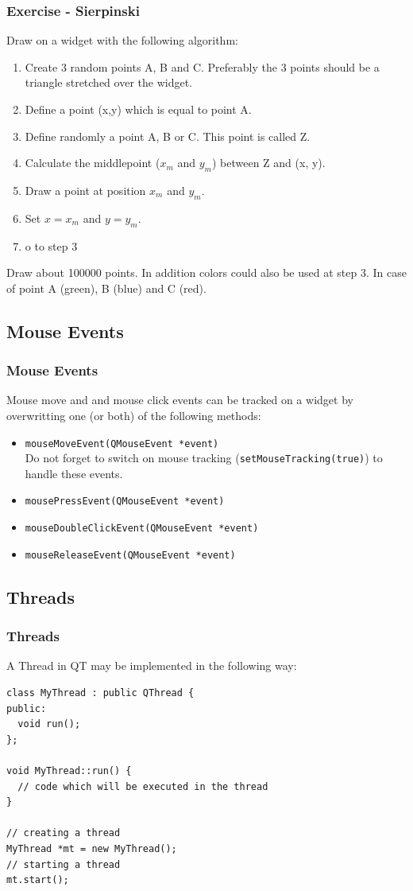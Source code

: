 \begin{frame}[fragile]
\frametitle{Exercise - Sierpinski}
Draw on a widget with the following algorithm:
{\small
\begin{enumerate}
\item Create 3 random points A, B and C. Preferably the 3 points should
be a triangle stretched over the widget.
\item Define a point (x,y) which is equal to point A.
\item Define randomly a point A, B or C. This point is called Z.
\item Calculate the middlepoint ($x_m$ and $y_m$) between Z and (x, y).
\item Draw a point at position $x_m$ and $y_m$.
\item Set $x=x_m$ and $y=y_m$.
\item o to step 3
\end{enumerate}
}
Draw about 100000 points. In addition colors could also be used at step 3. In case of point A (green), B (blue) and C (red).
\end{frame}

\subsection{Mouse Events}
\begin{frame}[fragile]
\frametitle{Mouse Events}
Mouse move and and mouse click events can be tracked on a widget by
overwritting one (or both) of the following methods:

\begin{itemize}
\item \verb|mouseMoveEvent(QMouseEvent *event)|\\
Do not forget to switch on mouse tracking (\verb|setMouseTracking(true)|) to handle these events.
\item \verb|mousePressEvent(QMouseEvent *event)|
\item \verb|mouseDoubleClickEvent(QMouseEvent *event)|
\item \verb|mouseReleaseEvent(QMouseEvent *event)|
\end{itemize}

\end{frame}

\subsection{Threads}
\begin{frame}[fragile]
\frametitle{Threads}
A Thread in QT may be implemented in the following way:
{\tiny
\begin{lstlisting}
class MyThread : public QThread {
public:
  void run();
};

void MyThread::run() {
  // code which will be executed in the thread
}

// creating a thread
MyThread *mt = new MyThread();
// starting a thread
mt.start();
\end{lstlisting}
}
\end{frame}


